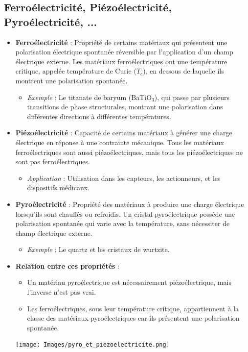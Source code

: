 \documentclass{article}
\begin{document}
    \subsection{Ferroélectricité, Piézoélectricité, Pyroélectricité, ...}
    
    \begin{itemize}
        \item \textbf{Ferroélectricité} : Propriété de certains matériaux qui présentent une polarisation électrique spontanée réversible par l'application d'un champ électrique externe. Les matériaux ferroélectriques ont une température critique, appelée température de Curie ($T_c$), en dessous de laquelle ils montrent une polarisation spontanée.
        \begin{itemize}
            \item \textit{Exemple} : Le titanate de baryum (BaTiO$_3$), qui passe par plusieurs transitions de phase structurales, montrant une polarisation dans différentes directions à différentes températures.
        \end{itemize}
        \item \textbf{Piézoélectricité} : Capacité de certains matériaux à générer une charge électrique en réponse à une contrainte mécanique. Tous les matériaux ferroélectriques sont aussi piézoélectriques, mais tous les piézoélectriques ne sont pas ferroélectriques.
        \begin{itemize}
            \item \textit{Application} : Utilisation dans les capteurs, les actionneurs, et les dispositifs médicaux.
        \end{itemize}
        \item \textbf{Pyroélectricité} : Propriété des matériaux à produire une charge électrique lorsqu'ils sont chauffés ou refroidis. Un cristal pyroélectrique possède une polarisation spontanée qui varie avec la température, sans nécessiter de champ électrique externe.
        \begin{itemize}
            \item \textit{Exemple} : Le quartz et les cristaux de wurtzite.
        \end{itemize}
        \item \textbf{Relation entre ces propriétés} :
        \begin{itemize}
            \item Un matériau pyroélectrique est nécessairement piézoélectrique, mais l'inverse n'est pas vrai.
            \item Les ferroélectriques, sous leur température critique, appartiennent à la classe des matériaux pyroélectriques car ils présentent une polarisation spontanée.
        \end{itemize}
            \texttt{[image: Images/pyro\_et\_piezoelectricite.png]}
    \end{itemize}
\end{document}
